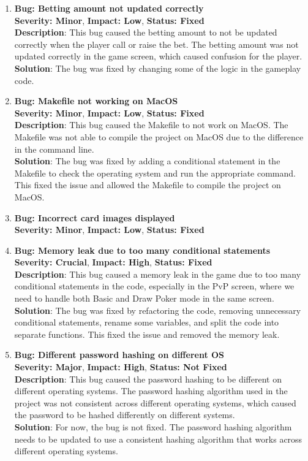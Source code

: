 \begin{enumerate}
    \item \textbf{Bug: Betting amount not updated correctly}
    \\ \textbf{Severity: Minor}, \textbf{Impact: Low}, \textbf{Status: Fixed}
    \\ \textbf{Description}: This bug caused the betting amount to not be updated correctly when the player call or raise the bet. The betting amount was not updated correctly in the game screen, which caused confusion for the player.
    \\ \textbf{Solution}: The bug was fixed by changing some of the logic in the gameplay code.
    
    \item \textbf{Bug: Makefile not working on MacOS}
    \\ \textbf{Severity: Minor}, \textbf{Impact: Low}, \textbf{Status: Fixed}
    \\ \textbf{Description}: This bug caused the Makefile to not work on MacOS. The Makefile was not able to compile the project on MacOS due to the difference in the command line.
    \\ \textbf{Solution}: The bug was fixed by adding a conditional statement in the Makefile to check the operating system and run the appropriate command. This fixed the issue and allowed the Makefile to compile the project on MacOS.
    \item \textbf{Bug: Incorrect card images displayed}
    \\ \textbf{Severity: Minor}, \textbf{Impact: Low}, \textbf{Status: Fixed}
    
    \item \textbf{Bug: Memory leak due to too many conditional statements}
    \\ \textbf{Severity: Crucial}, \textbf{Impact: High}, \textbf{Status: Fixed}
    \\ \textbf{Description}: This bug caused a memory leak in the game due to too many conditional statements in the code, especially in the PvP screen, where we need to handle both Basic and Draw Poker mode in the same screen.
    \\ \textbf{Solution}: The bug was fixed by refactoring the code, removing unnecessary conditional statements, rename some variables, and split the code into separate functions. This fixed the issue and removed the memory leak.
    
    \item \textbf{Bug: Different password hashing on different OS}
    \\ \textbf{Severity: Major}, \textbf{Impact: High}, \textbf{Status: Not Fixed}
    \\ \textbf{Description}: This bug caused the password hashing to be different on different operating systems. The password hashing algorithm used in the project was not consistent across different operating systems, which caused the password to be hashed differently on different systems.
    \\ \textbf{Solution}: For now, the bug is not fixed. The password hashing algorithm needs to be updated to use a consistent hashing algorithm that works across different operating systems.
    

\end{enumerate}
